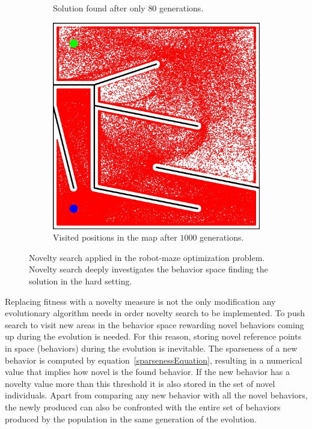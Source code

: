 \begin{figure}[t!]
\begin{subfigure}[b]{0.3\textwidth}
\caption{Solution found after only $80$ generations.}
\label{fig:mazeNoveltyHardSolution}
\end{subfigure}\hspace{0.3cm}
\begin{subfigure}[b]{0.3\textwidth}
\includegraphics[width=1.0\textwidth]{../Figures/Misc/MazeHardNovelty.jpg}
\caption{ Visited positions in the map after $1000$ generations.}
\label{fig:mazeNoveltyHard}
\end{subfigure}
\caption{Novelty search applied in the robot-maze optimization problem. Novelty search deeply investigates the behavior space finding the solution in the hard setting.}
\label{fig:mazeNovelty}
\end{figure}


Replacing fitness with a novelty measure is not the only modification any evolutionary algorithm needs in order novelty search to be implemented. To push search to visit new areas in the behavior space rewarding novel behaviors coming up during the evolution is needed. For this reason, storing novel reference points in space (behaviors) during the evolution is inevitable. The sparseness of a new behavior is computed by equation~\ref{sparsenessEquation}, resulting in a numerical value that implies how novel is the found behavior. If the new behavior has a novelty value more than this threshold it is also stored in the set of novel individuals. Apart from comparing any new behavior with all the novel behaviors, the newly produced can also be confronted with the entire set of behaviors produced by the population in the same generation of the evolution. 

